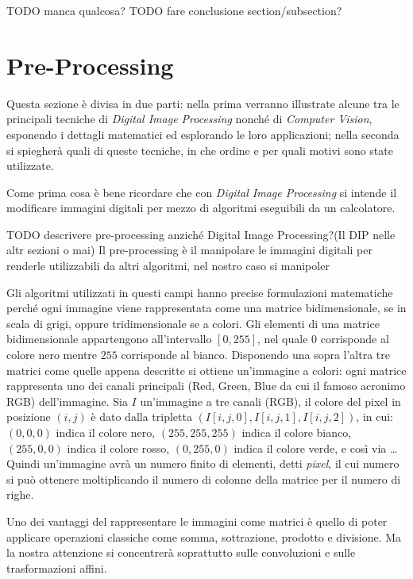 TODO manca qualcosa?
TODO fare conclusione section/subsection?




\section{Pre-Processing}
Questa sezione è divisa in due parti: nella prima verranno illustrate alcune tra le principali tecniche di \textit{Digital Image Processing} nonché di \textit{Computer Vision}, esponendo i dettagli matematici ed esplorando le loro applicazioni; nella seconda si spiegherà quali di queste tecniche, in che ordine e per quali motivi sono state utilizzate.

Come prima cosa è bene ricordare che con \textit{Digital Image Processing} si intende il modificare immagini digitali per mezzo di algoritmi eseguibili da un calcolatore.

TODO descrivere pre-processing anziché Digital Image Processing?(Il DIP nelle altr sezioni o mai)
Il pre-processing è il manipolare le immagini digitali per renderle utilizzabili da altri algoritmi, nel nostro caso si manipoler

Gli algoritmi utilizzati in questi campi hanno precise formulazioni matematiche perché ogni immagine viene rappresentata come una matrice bidimensionale, se in scala di grigi, oppure tridimensionale se a colori.
Gli elementi di una matrice bidimensionale appartengono all'intervallo $[0,255]$, nel quale $0$ corrisponde al colore nero mentre $255$ corrisponde al bianco.
Disponendo una sopra l'altra tre matrici come quelle appena descritte si ottiene un'immagine a colori: ogni matrice rappresenta uno dei canali principali (Red, Green, Blue da cui il famoso acronimo RGB) dell'immagine.
Sia $I$ un'immagine a tre canali (RGB), il colore del pixel in posizione $(i,j)$ è dato dalla tripletta $(I[i,j,0], I[i,j,1], I[i,j,2])$, in cui: $(0,0,0)$ indica il colore nero, $(255,255,255)$ indica il colore bianco, $(255,0,0)$ indica il colore rosso, $(0,255,0)$ indica il colore verde, e così via \dots
Quindi un'immagine avrà un numero finito di elementi, detti \textit{pixel}, il cui numero si può ottenere moltiplicando il numero di colonne della matrice per il numero di righe.


Uno dei vantaggi del rappresentare le immagini come matrici è quello di poter applicare operazioni classiche come somma, sottrazione, prodotto e divisione.
Ma la nostra attenzione si concentrerà soprattutto sulle convoluzioni e sulle trasformazioni affini.

